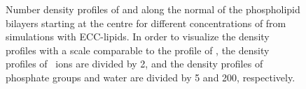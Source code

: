 \documentclass[12pt,a4paper,twoside,openright]{report}
\begin{document}
\begin{figure}[tb]
  \caption{ 
    Number density profiles of  and  along the normal of the phospholipid bilayers starting at the centre 
    for different concentrations of  from simulations with ECC-lipids. 
    In order to visualize the density profiles with a scale comparable to the profile of ,  
    the density profiles of~ ions are divided by 2, and 
    the density profiles of phosphate groups and water are divided by 5 and 200, respectively.  
    } 
\end{figure} 
\end{document}
